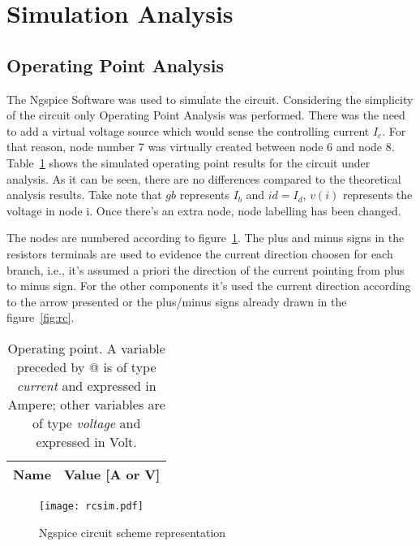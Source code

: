 \section{Simulation Analysis}
\label{sec:simulation}
\vspace{10mm}
\subsection{Operating Point Analysis}
The Ngspice Software was used to simulate the circuit. Considering the simplicity of the circuit only
Operating Point Analysis was performed.
There was the need to add a virtual voltage source which
would sense the controlling current $I_c$. For that reason, node number 7 was virtually created between node 6 and node 8.
Table~\ref{tab:op} shows the simulated operating point results for the circuit
under analysis. As it can be seen, there are no differences compared to the theoretical analysis results. Take note that $gb$
represents $I_b$ and $id = I_d$, $v(i)$ represents the voltage in node i. Once there's an extra node, node labelling has been changed.

The nodes are numbered according to figure~\ref{fig:rcsim}. The plus and minus signs in the resistors terminals
are used to evidence the current direction choosen for each branch, i.e., it's assumed a priori 
the direction of the current pointing from plus to minus sign. For the other components it's used the current direction
according to the arrow presented or the plus/minus signs already drawn in the figure~\ref{fig:rc}. 


\vspace{10mm}

\begin{table}[ht]
  \centering
  \begin{tabular}{|c|c|}
    \hline    
    {\bf Name} & {\bf Value [A or V]} \\ \hline
    
  \end{tabular}
  \vspace{20mm}
  \caption{Operating point. A variable preceded by @ is of type {\em current}
    and expressed in Ampere; other variables are of type {\it voltage} and expressed in
    Volt.}
  \label{tab:op}
\end{table}



\begin{figure}[ht] \centering
  \texttt{[image: rcsim.pdf]}
  \caption{Ngspice circuit scheme representation}
  \label{fig:rcsim}
\end{figure}





